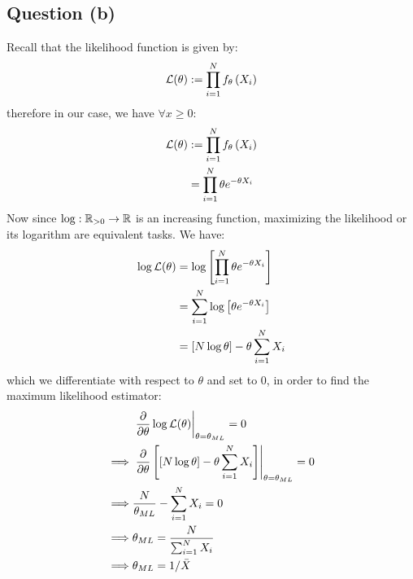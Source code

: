 \documentclass[12pt]{article}
\begin{document}
\subsection{Question (b)}
Recall that the likelihood function is given by:
\[
    \mathcal{L} (\theta) := \prod_{i=1}^N f_{\theta} \left( X_i \right)
\]
therefore in our case, we have \(\forall x \geq 0\):
\begin{align*}
    \mathcal{L} (\theta)
     & := \prod_{i=1}^N f_{\theta} \left( X_i \right) \\
     & = \prod_{i=1}^N \theta e^{-\theta X_i}         \\
\end{align*}
Now since \(\log : \mathbb{R}_{>0} \to \mathbb{R}\) is an increasing function, maximizing the likelihood or its logarithm are equivalent tasks. We have:
\begin{align*}
    \log \mathcal{L} (\theta)
     & = \log\left[ \prod_{i=1}^N \theta e^{-\theta X_i} \right] \\
     & = \sum_{i=1}^N \log \left[ \theta e^{-\theta X_i} \right] \\
     & = \left[N \log \theta\right] - \theta \sum_{i=1}^N X_i    \\
\end{align*}
which we differentiate with respect to \(\theta\) and set to 0, in order to find the maximum likelihood estimator:
\begin{align*}
             & \left. \frac{\partial}{\partial \theta} \log \mathcal{L} (\theta) \right|_{\theta=\theta_{ML}} = 0                                                  \\
    \implies & \left. \frac{\partial}{\partial \theta} \left[\left[N \log \theta\right] - \theta \sum_{i=1}^N X_i\right] \right|_{\theta=\theta_{ML}} = 0 \\
    \implies & \frac{N}{\theta_{ML}} - \sum_{i=1}^N X_i = 0                                                                                               \\
    \implies & \theta_{ML} = \frac{N}{\sum_{i=1}^N X_i}                                                                                                   \\
    \implies & \theta_{ML} = 1/\bar{X}                                                                                                                    \\
\end{align*}
\end{document}
